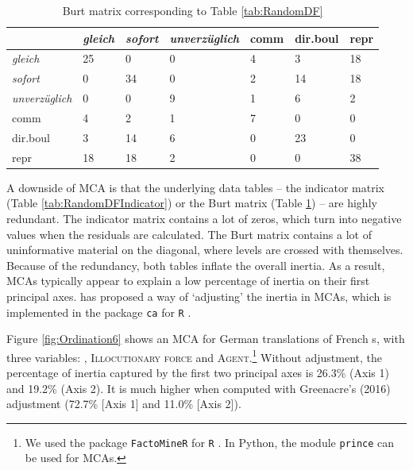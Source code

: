 \begin{table}[t]
  \centering
  \begin{tabular}[h]{l|lll|lll}
               & \textit{gleich} & \textit{sofort} & \textit{unverzüglich} & comm & dir.boul &repr\\\hline
\textit{gleich}         & 25            & 0                  & 0                & 4 & 3               & 18\\
\textit{sofort}         & 0           & 34                  & 0                & 2 & 14               & 18\\
\textit{unverzüglich}   & 0            & 0                  & 9                & 1 & 6                & 2\\\hline
comm           & 4            & 2                  & 1                & 7 & 0                & 0\\
dir.boul       & 3           & 14                  & 6                & 0 & 23                & 0\\
repr           & 18           & 18                  & 2                & 0 & 0               & 38\\
  \end{tabular}
  \caption{Burt matrix corresponding to Table \ref{tab:RandomDF}}
  \label{tab:BurtMat}
\end{table}

A downside of MCA is that the underlying data tables -- the indicator
matrix (Table \ref{tab:RandomDFIndicator}) or the Burt matrix (Table
\ref{tab:BurtMat}) -- are highly redundant. The indicator matrix
contains a lot of zeros, which turn into negative values when the
residuals are calculated. The Burt matrix contains a lot of
uninformative material on the diagonal, where levels are crossed with
themselves. Because of the redundancy, both tables inflate the overall
inertia. As a result, MCAs typically appear to explain a low
percentage of inertia on their first principal axes.
%
\citet{Greenacre2016} has proposed a way of `adjusting' the inertia in
MCAs, which is implemented in the package \verb+ca+ for
\verb+R+ \citep{ca-package}. 

Figure \ref{fig:Ordination6} shows an MCA for German translations of
French \ipadv s, with three variables: \textsc{\ipadv},
\textsc{Illocutionary force} and \textsc{Agent}.\footnote{We used the
  package \verb+FactoMineR+ for \verb+R+
  \citep{FactoMineR-package}. In Python, the module \verb+prince+ can
  be used for MCAs.} Without adjustment, the percentage of inertia
captured by the first two principal axes is 26.3\% (Axis 1) and 19.2\%
(Axis 2). It is much higher when computed with Greenacre's (2016)
adjustment (72.7\% [Axis 1] and 11.0\% [Axis 2]).

